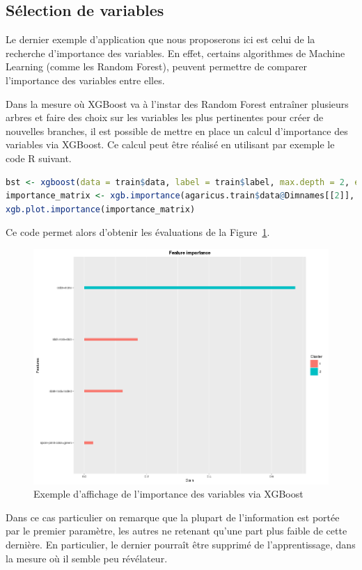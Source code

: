 \subsection{Sélection de variables}
Le dernier exemple d'application que nous proposerons ici est celui de la recherche d'importance des variables. En effet, certains algorithmes de Machine Learning (comme les Random Forest), peuvent permettre de comparer l'importance des variables entre elles.

Dans la mesure où XGBoost va à l'instar des Random Forest entraîner plusieurs arbres et faire des choix sur les variables les plus pertinentes pour créer de nouvelles branches, il est possible de mettre en place un calcul d'importance des variables via XGBoost. Ce calcul peut être réalisé en utilisant par exemple le code R suivant.
\begin{lstlisting}[language=R]
bst <- xgboost(data = train$data, label = train$label, max.depth = 2, eta = 1, nthread = 2, nround = 2,objective = "binary:logistic")
importance_matrix <- xgb.importance(agaricus.train$data@Dimnames[[2]], model = bst)
xgb.plot.importance(importance_matrix)
\end{lstlisting}
Ce code permet alors d'obtenir les évaluations de la Figure~\ref{fig:feature-importance}.

\begin{figure}[h]
	\begin{margincap}
		\centering
		\includegraphics[width=.7\textwidth]{images/Exemples/feature-importance}
		\caption{Exemple d'affichage de l'importance des variables via XGBoost}
		\label{fig:feature-importance}
	\end{margincap}
\end{figure}

Dans ce cas particulier on remarque que la plupart de l'information est portée par le premier paramètre, les autres ne retenant qu'une part plus faible de cette dernière. En particulier, le dernier pourraît être supprimé de l'apprentissage, dans la mesure où il semble peu révélateur.
